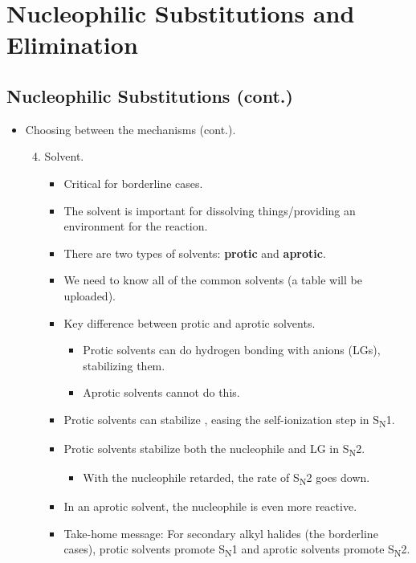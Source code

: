 \documentclass[../notes.tex]{subfiles}
\begin{document}
\chapter{Nucleophilic Substitutions and Elimination}
\section{Nucleophilic Substitutions (cont.)}
\begin{itemize}
    \item {}Choosing between the mechanisms (cont.).
    \begin{enumerate}
        \setcounter{enumi}{3}
        \item Solvent.
        \begin{itemize}
            \item Critical for borderline cases.
            \item The solvent is important for dissolving things/providing an environment for the reaction.
            \item There are two types of solvents: \textbf{protic} and \textbf{aprotic}.
            \item We need to know all of the common solvents (a table will be uploaded).
            \item Key difference between protic and aprotic solvents.
            \begin{itemize}
                \item Protic solvents can do hydrogen bonding with anions (LGs), stabilizing them.
                \item Aprotic solvents cannot do this.
            \end{itemize}
            \item Protic solvents can stabilize , easing the self-ionization step in S\textsubscript{N}1.
            \item Protic solvents stabilize both the nucleophile and LG in S\textsubscript{N}2.
            \begin{itemize}
                \item With the nucleophile retarded, the rate of S\textsubscript{N}2 goes down.
            \end{itemize}
            \item In an aprotic solvent, the nucleophile is even more reactive.
            \item Take-home message: For secondary alkyl halides (the borderline cases), protic solvents promote S\textsubscript{N}1 and aprotic solvents promote S\textsubscript{N}2.

\end{itemize}
\end{enumerate}
\end{itemize}
\end{document}
